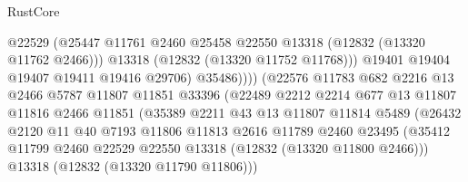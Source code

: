 \begin{lexlean}{RustCore}
\begin{coremodule}
                                      @22529
                                      (@25447
                                        @11761
                                        @2460
                                        @25458
                                        @22550
                                        @13318
                                        (@12832 (@13320 @11762 @2466)))
                                      @13318
                                      (@12832 (@13320 @11752 @11768)))
                                    @19401
                                    @19404
                                    @19407
                                    @19411
                                    @19416
                                    @29706)
                                  @35486))))
                          (@22576
                            @11783
                            @682
                            @2216
                            @13
                            @2466
                            @5787
                            @11807
                            @11851
                            @33396
                            (@22489
                              @2212
                              @2214
                              @677
                              @13
                              @11807
                              @11816
                              @2466
                              @11851
                              (@35389
                                @2211
                                @43
                                @13
                                @11807
                                @11814
                                @5489
                                (@26432
                                  @2120
                                  @11
                                  @40
                                  @7193
                                  @11806
                                  @11813
                                  @2616
                                  @11789
                                  @2460
                                  @23495
                                  (@35412
                                    @11799
                                    @2460
                                    @22529
                                    @22550
                                    @13318
                                    (@12832 (@13320 @11800 @2466)))
                                  @13318
                                  (@12832 (@13320 @11790 @11806)))

\end{coremodule}
\end{lexlean}
